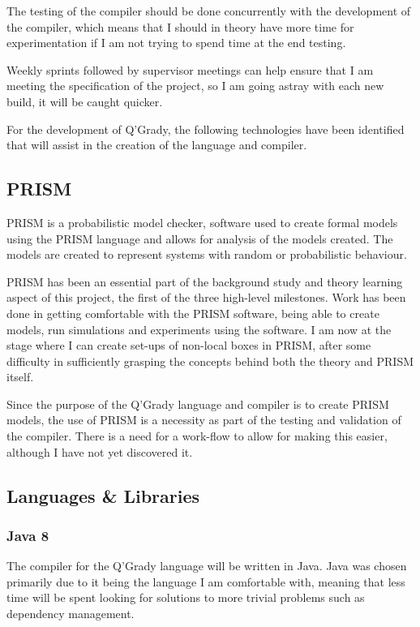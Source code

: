 \documentclass[11pt, a4paper]{article}
\begin{document}
The testing of the compiler should be done concurrently with the development of
the compiler, which means that I should in theory have more time for
experimentation if I am not trying to spend time at the end testing.

Weekly sprints followed by supervisor meetings can help ensure that I am meeting
the specification of the project, so I am going astray with each new build, it
will be caught quicker.

For the development of Q'Grady, the following technologies have been identified
that will assist in the creation of the language and compiler.

\subsection{PRISM} %
\label{sub:prism}
PRISM is a probabilistic model checker, software used to create formal models
using the PRISM language and allows for analysis of the models created. The
models are created to represent systems with random or probabilistic behaviour.

PRISM has been an essential part of the background study and theory learning
aspect of this project, the first of the three high-level milestones. Work has
been done in getting comfortable with the PRISM software, being able to create
models, run simulations and experiments using the software. I am now at the
stage where I can create set-ups of non-local boxes in PRISM, after some
difficulty in sufficiently grasping the concepts behind both the theory and
PRISM itself.

Since the purpose of the Q'Grady language and compiler is to create PRISM
models, the use of PRISM is a necessity as part of the testing and validation of
the compiler. There is a need for a work-flow to allow for making this easier,
although I have not yet discovered it.
\subsection{Languages \& Libraries} %
\label{sub:languages_libraries}
\subsubsection{Java 8} %
\label{ssub:java_8}
The compiler for the Q'Grady language will be written in Java. Java was chosen
primarily due to it being the language I am comfortable with, meaning that less
time will be spent looking for solutions to more trivial problems such as
dependency management.
\end{document}
